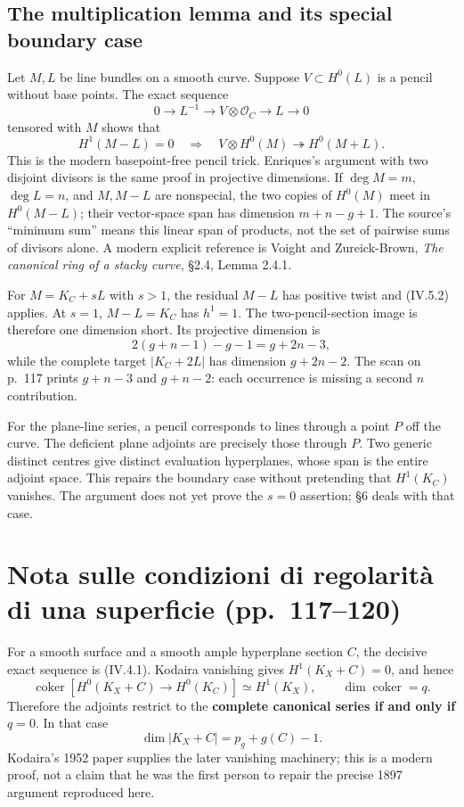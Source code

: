 \subsection{The multiplication lemma and its special boundary case}

Let \(M,L\) be line bundles on a smooth curve. Suppose \(V\subset H^0(L)\) is a pencil without base points. The exact sequence \[
 0\longrightarrow L^{-1}\longrightarrow V\otimes\mathcal O_C
 \longrightarrow L\longrightarrow0
\] tensored with \(M\) shows that \[
 H^1(M-L)=0
 \quad\Longrightarrow\quad
 V\otimes H^0(M)\twoheadrightarrow H^0(M+L).
 \tag{IV.5.2}
\] This is the modern basepoint-free pencil trick. Enriques's argument with two disjoint divisors is the same proof in projective dimensions. If \(\deg M=m\), \(\deg L=n\), and \(M,M-L\) are nonspecial, the two copies of \(H^0(M)\) meet in \(H^0(M-L)\); their vector-space span has dimension \(m+n-g+1\). The source's ``minimum sum'' means this linear span of products, not the set of pairwise sums of divisors alone. A modern explicit reference is Voight and Zureick-Brown, \emph{The canonical ring of a stacky curve}, §2.4, Lemma 2.4.1.

For \(M=K_C+sL\) with \(s>1\), the residual \(M-L\) has positive twist and (IV.5.2) applies. At \(s=1\), \(M-L=K_C\) has \(h^1=1\). The two-pencil-section image is therefore one dimension short. Its projective dimension is \[
 2(g+n-1)-g-1=g+2n-3,
\] while the complete target \(|K_C+2L|\) has dimension \(g+2n-2\). The scan on p.~117 prints \(g+n-3\) and \(g+n-2\): each occurrence is missing a second \(n\) contribution.

For the plane-line series, a pencil corresponds to lines through a point \(P\) off the curve. The deficient plane adjoints are precisely those through \(P\). Two generic distinct centres give distinct evaluation hyperplanes, whose span is the entire adjoint space. This repairs the boundary case without pretending that \(H^1(K_C)\) vanishes. The argument does not yet prove the \(s=0\) assertion; §6 deals with that case.

\section[Condizioni di regolarità]{Nota sulle condizioni di regolarità di una superficie (pp.~117--120)}\label{enriques-iv-6}

For a smooth surface and a smooth ample hyperplane section \(C\), the decisive exact sequence is (IV.4.1). Kodaira vanishing gives \(H^1(K_X+C)=0\), and hence \[
 \operatorname{coker}\!\left[H^0(K_X+C)\to H^0(K_C)\right]
 \simeq H^1(K_X),\qquad
 \dim\operatorname{coker}=q.
 \tag{IV.6.1}
\] Therefore the adjoints restrict to the \textbf{complete canonical series if and only if \(q=0\)}. In that case \[
 \dim|K_X+C|=p_g+g(C)-1.
\] Kodaira's 1952 paper supplies the later vanishing machinery; this is a modern proof, not a claim that he was the first person to repair the precise 1897 argument reproduced here.

